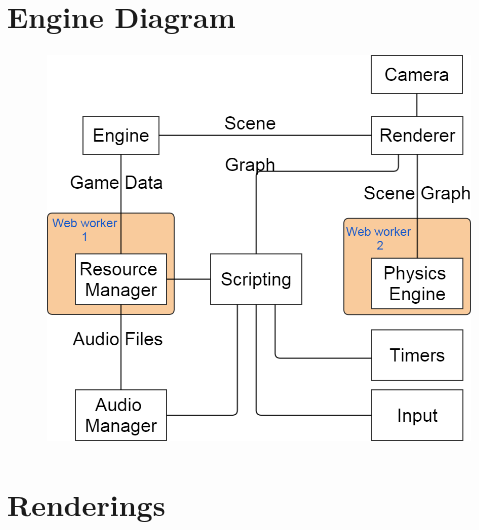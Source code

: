 \chapter{Engine Diagram}



%
\begin{center}
	\begin{figure}[here!]
		\includegraphics[width=\textwidth]{src/img/engine-diagram.png}
		\label{img:engine}
	\end{figure}
\end{center}


\chapter{Renderings}

